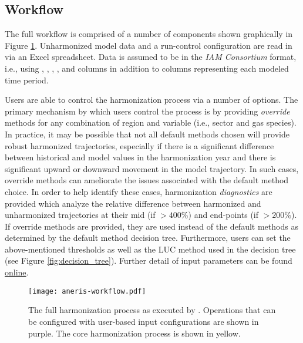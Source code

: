 \subsection{ Workflow}\label{sec:workflow}

The full  workflow is comprised of a number of components shown
graphically in Figure \ref{fig:workflow}. Unharmonized model data and a
run-control configuration are read in via an Excel spreadsheet. Data is assumed
to be in the \textit{IAM Consortium} format, i.e., using ,
, , , and  columns in
addition to columns representing each modeled time period. 

Users are able to control the harmonization process via a number of options. The
primary mechanism by which users control the process is by providing
\textit{override} methods for any combination of region and variable (i.e.,
sector and gas species).  In practice, it may be possible that not all default
methods chosen will provide robust harmonized trajectories, especially if there
is a significant difference between historical and model values in the
harmonization year and there is significant upward or downward movement in the
model trajectory. In such cases, override methods can ameliorate the issues
associated with the default method choice. In order to help identify these
cases, harmonization \textit{diagnostics} are provided which analyze the
relative difference between harmonized and unharmonized trajectories at their
mid (if $> 400$\%) and end-points (if $> 200$\%). If override methods are
provided, they are used instead of the default methods as determined by the
default method decision tree. Furthermore, users can set the above-mentioned
thresholds as well as the LUC method used in the decision tree (see Figure
\ref{fig:decision_tree}). Further detail of input parameters can be found
\href{http://mattgidden.com/aneris/config.html}{online}.

\begin{figure}
  \begin{center}
    \texttt{[image: aneris-workflow.pdf]}
    \caption[]{
      \label{fig:workflow}
      The full harmonization process as executed by . Operations
      that can be configured with user-based input configurations are shown in
      purple. The core harmonization process is shown in yellow.  }
  \end{center}
\end{figure}

